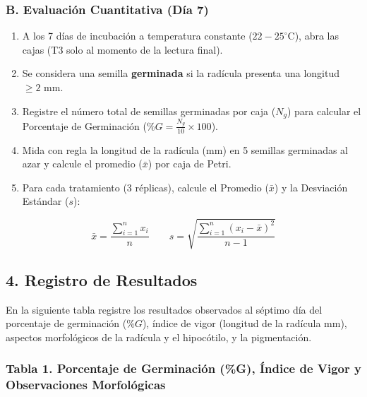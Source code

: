 \documentclass[
  spanish,
  10pt,
  letterpaper,
  twocolumn]{article}
\providecommand{\tightlist}{%
  \setlength{\itemsep}{0pt}\setlength{\parskip}{0pt}}
\begin{document}
\subsubsection{B. Evaluación Cuantitativa (Día
7)}\label{b.-evaluaciuxf3n-cuantitativa-duxeda-7}

\begin{enumerate}
\def\labelenumi{\arabic{enumi}.}
\tightlist
\item
  A los 7 días de incubación a temperatura constante
  (\(22-25^\circ\text{C}\)), abra las cajas (T3 solo al momento de la
  lectura final).
\item
  Se considera una semilla \textbf{germinada} si la radícula presenta
  una longitud \(\ge 2\text{ mm}\).
\item
  Registre el número total de semillas germinadas por caja (\(N_g\))
  para calcular el Porcentaje de Germinación
  (\(\%G = \frac{N_g}{10} \times 100\)).
\item
  Mida con regla la longitud de la radícula (\(\text{mm}\)) en 5
  semillas germinadas al azar y calcule el promedio (\(\bar{x}\)) por
  caja de Petri.
\item
  Para cada tratamiento (3 réplicas), calcule el Promedio (\(\bar{x}\))
  y la Desviación Estándar (\(s\)):
\end{enumerate}

\[\bar{x} = \frac{\sum_{i=1}^{n} x_i}{n} \qquad s = \sqrt{\frac{\sum_{i=1}^{n} (x_i - \bar{x})^2}{n - 1}}\]

\subsection{4. Registro de Resultados}\label{registro-de-resultados}

En la siguiente tabla registre los resultados observados al séptimo día
del porcentaje de germinación (\(\%G\)), índice de vigor (longitud de la
radícula mm), aspectos morfológicos de la radícula y el hipocótilo, y la
pigmentación.

\subsubsection{Tabla 1. Porcentaje de Germinación (\%G), Índice de Vigor
y Observaciones
Morfológicas}\label{tabla-1.-porcentaje-de-germinaciuxf3n-g-uxedndice-de-vigor-y-observaciones-morfoluxf3gicas}
\end{document}
